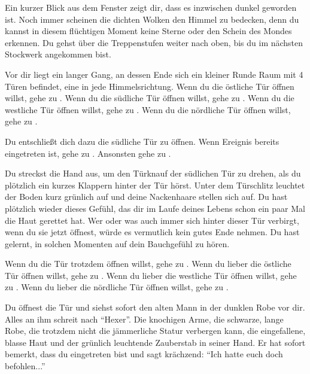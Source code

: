 Ein kurzer Blick aus dem Fenster zeigt dir, dass es inzwischen dunkel geworden ist. Noch immer scheinen die dichten Wolken den Himmel zu bedecken, denn du kannst in diesem flüchtigen Moment keine Sterne oder den Schein des Mondes erkennen.
Du gehst über die Treppenstufen weiter nach oben, bis du im nächsten Stockwerk angekommen bist.

Vor dir liegt ein langer Gang, an dessen Ende sich ein kleiner Runde Raum mit 4 Türen befindet, eine in jede Himmelsrichtung.
Wenn du die östliche Tür öffnen willst, gehe zu .
Wenn du die südliche Tür öffnen willst, gehe zu .
Wenn du die westliche Tür öffnen willst, gehe zu .
Wenn du die nördliche Tür öffnen willst, gehe zu .


Du entschließt dich dazu die südliche Tür zu öffnen.
Wenn Ereignis  bereits eingetreten ist, gehe zu . Ansonsten gehe zu .


Du streckst die Hand aus, um den Türknauf der südlichen Tür zu drehen, als du plötzlich ein kurzes Klappern hinter der Tür hörst. Unter dem Türschlitz leuchtet der Boden kurz grünlich auf und deine Nackenhaare stellen sich auf. Du hast plötzlich wieder dieses Gefühl, das dir im Laufe deines Lebens schon ein paar Mal die Haut gerettet hat. Wer oder was auch immer sich hinter dieser Tür verbirgt, wenn du sie jetzt öffnest, würde es vermutlich kein gutes Ende nehmen. Du hast gelernt, in solchen Momenten auf dein Bauchgefühl zu hören.

Wenn du die Tür trotzdem öffnen willst, gehe zu .
Wenn du lieber die östliche Tür öffnen willst, gehe zu .
Wenn du lieber die westliche Tür öffnen willst, gehe zu .
Wenn du lieber die nördliche Tür öffnen willst, gehe zu .


Du öffnest die Tür und siehst sofort den alten Mann in der dunklen Robe vor dir. Alles an ihm schreit nach ``Hexer''. Die knochigen Arme, die schwarze, lange Robe, die trotzdem nicht die jämmerliche Statur verbergen kann, die eingefallene, blasse Haut und der grünlich leuchtende Zauberstab in seiner Hand. Er hat sofort bemerkt, dass du eingetreten bist und sagt krächzend: ``Ich hatte euch doch befohlen...''

